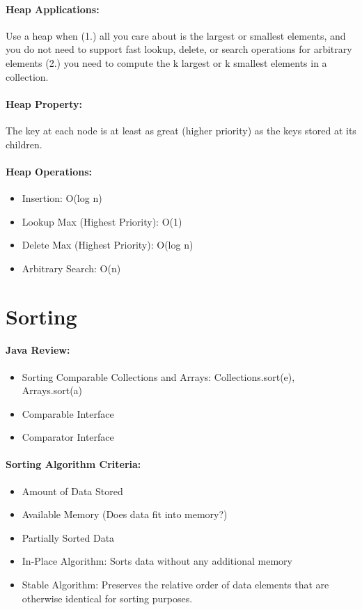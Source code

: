 \documentclass[12pt]{article}
\begin{document}
\paragraph{Heap Applications:} Use a heap when (1.) all you care about is the largest or smallest elements, and you do not need to support fast lookup, delete, or search operations for arbitrary elements
(2.) you need to compute the k largest or k smallest elements in a collection.

\paragraph{Heap Property:} The key at each node is at least as great (higher priority) as the keys stored at its children.

\paragraph{Heap Operations:}
\begin{itemize}
	\item Insertion: O(log n)
	\item Lookup Max (Highest Priority): O(1)
	\item Delete Max (Highest Priority): O(log n)
	\item Arbitrary Search: O(n)
\end{itemize}

\section{Sorting}

\paragraph{Java Review:}
\begin{itemize}
	\item Sorting Comparable Collections and Arrays: Collections.sort(e), Arrays.sort(a)
	\item Comparable Interface
	\item Comparator Interface
\end{itemize}

\paragraph{Sorting Algorithm Criteria:}
\begin{itemize}
	\item Amount of Data Stored
	\item Available Memory (Does data fit into memory?)
	\item Partially Sorted Data
	\item In-Place Algorithm: Sorts data without any additional memory
	\item Stable Algorithm: Preserves the relative order of data elements that are otherwise identical for sorting purposes.
\end{itemize}
\end{document}

